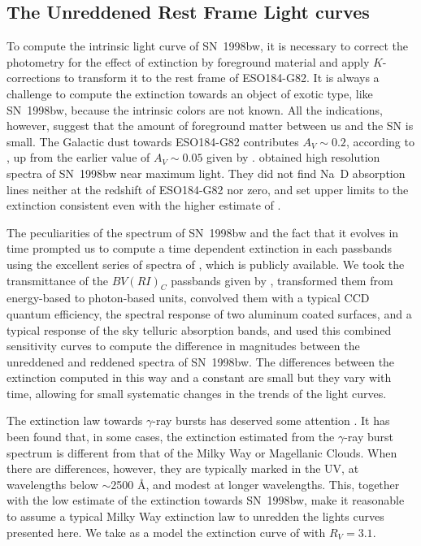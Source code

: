 \documentclass[12pt,preprint]{aastex}
\begin{document}
\subsection{The Unreddened Rest Frame Light curves}

To compute the intrinsic light curve of SN~1998bw, it is necessary to correct the photometry for the effect of extinction by foreground material
and apply $K$-corrections to transform it to the rest frame of ESO184-G82.
%
It is always a challenge to compute the extinction towards an object of exotic type, like SN~1998bw, because the intrinsic colors are not known.
%
All the indications, however, suggest that the amount of foreground matter between us and the SN is small.
%
The Galactic dust towards ESO184-G82 contributes $A_V \sim 0.2$, according to \citet{sfandd98}, up from the earlier value of $A_V \sim 0.05$
given by \citet{bandh82}.
%
\citet{petal01} obtained high resolution spectra of SN~1998bw near maximum light. They did not find Na~D absorption lines neither at the redshift of
ESO184-G82 nor zero, and set upper limits to the extinction consistent even with the higher estimate of \citet{sfandd98}.

The peculiarities of the spectrum of SN~1998bw and the fact that it evolves in time prompted us to compute a time dependent extinction in each
passbands using the excellent series of spectra of \citet{petal01}, which is publicly available.
%
We took the transmittance of the $BV(RI)_C$ passbands given by \citet{bessell90},
transformed them from energy-based to photon-based units, convolved them with
a typical CCD quantum efficiency, the spectral response of two aluminum coated surfaces, and a typical
response of the sky telluric absorption bands, and used this combined sensitivity curves to compute the difference in magnitudes
between the unreddened and reddened spectra of SN~1998bw.
%
The differences between the extinction computed in this way and a constant are small but they vary with time, allowing for small systematic
changes in the trends of the light curves.

The extinction law towards $\gamma$-ray bursts has deserved some attention \citep[see ][ and references therein]{landl10}. It has been found that, in
some cases, the extinction estimated from the $\gamma$-ray burst spectrum is different from that of the Milky Way or Magellanic Clouds.
%
When there are differences, however, they are typically
marked in the UV, at wavelengths below $\sim$2500 \AA, and modest at longer wavelengths.
%
This, together with the low estimate of the extinction towards SN~1998bw, make it
reasonable to assume a typical Milky Way extinction law to unredden the lights curves presented here.
%
We take as a model the extinction curve of \citet{ccandm89} with $R_V = 3.1$.
\end{document}
